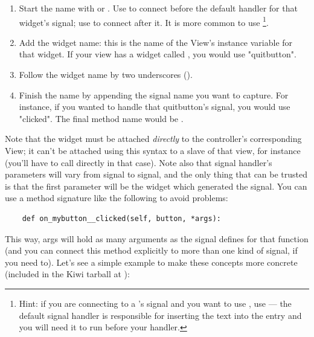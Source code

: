 \documentclass[a4paper]{howto}
\begin{document}
\begin{enumerate}
\item Start the name with  or . Use  to
connect before the default handler for that widget's signal; use
 to connect after it. It is more common to use
\footnote{Hint: if you are connecting
to a 's  signal and you want to use
, use 
--- the default signal handler is responsible for inserting the text
into the entry and you will need it to run before your handler.}.

\item Add the widget name: this is the name of the View's instance
variable for that widget.  If your view has a widget called
, you would use "quitbutton".

\item Follow the widget name by two underscores (\code{\_\_}).

\item Finish the name by appending the signal name you want to capture.
For instance, if you wanted to handle that quitbutton's 
signal, you would use "clicked". The final method name would be
.
\end{enumerate}

Note that the widget must be attached {\it directly} to the controller's
corresponding View; it can't be attached using this syntax to a slave of
that view, for instance (you'll have to call  directly
in that case). Note also that signal handler's parameters will vary from
signal to signal, and the only thing that can be trusted is that the
first parameter will be the widget which generated the signal. You can
use a method signature like the following to avoid problems:

\begin{verbatim}
    def on_mybutton__clicked(self, button, *args):
\end{verbatim}

This way, args will hold as many arguments as the signal defines for
that function (and you can connect this method explicitly to more than
one kind of signal, if you need to). Let's see a simple example to make
these concepts more concrete (included in the Kiwi tarball at
):

\end{document}
